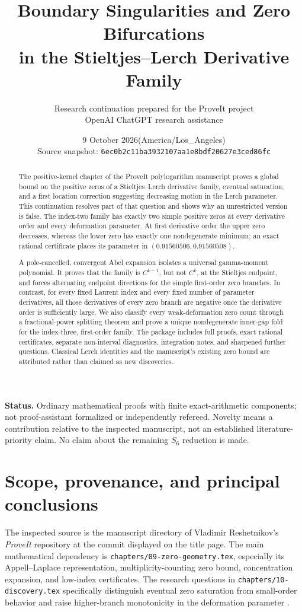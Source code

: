 \documentclass[11pt,letterpaper]{article}
\title{Boundary Singularities and Zero Bifurcations\\in the Stieltjes--Lerch Derivative Family}
\author{Research continuation prepared for the ProveIt project\\
\small OpenAI ChatGPT research assistance}
\date{9 October 2026\quad (America/Los\_Angeles)\\[4pt]
\small Source snapshot: \texttt{6ec0b2c11ba3932107aa1e8bdf20627e3ced86fc}}
\numberwithin{equation}{section}
\theoremstyle{definition}\newtheorem{definition}[theorem]{Definition}
\theoremstyle{remark}\newtheorem{remark}[theorem]{Remark}
\newcommand{\src}[1]{\nolinkurl{#1}}
\begin{document}
\maketitle
\begin{abstract}
The positive-kernel chapter of the ProveIt polylogarithm manuscript proves a global bound on the positive zeros of a Stieltjes--Lerch derivative family, eventual saturation, and a first location correction suggesting decreasing motion in the Lerch parameter. This continuation resolves part of that question and shows why an unrestricted version is false. The index-two family has exactly two simple positive zeros at every derivative order and every deformation parameter. At first derivative order the upper zero decreases, whereas the lower zero has exactly one nondegenerate minimum; an exact rational certificate places its parameter in $(0.91560506,0.91560508)$.

A pole-cancelled, convergent Abel expansion isolates a universal gamma-moment polynomial. It proves that the family is $C^{k-1}$, but not $C^k$, at the Stieltjes endpoint, and forces alternating endpoint directions for the simple first-order zero branches. In contrast, for every fixed Laurent index and every fixed number of parameter derivatives, all those derivatives of every zero branch are negative once the derivative order is sufficiently large. We also classify every weak-deformation zero count through a fractional-power splitting theorem and prove a unique nondegenerate inner-gap fold for the index-three, first-order family. The package includes full proofs, exact rational certificates, separate non-interval diagnostics, integration notes, and sharpened further questions. Classical Lerch identities and the manuscript's existing zero bound are attributed rather than claimed as new discoveries.
\end{abstract}
\vspace{5pt}
\noindent\textbf{Status.} Ordinary mathematical proofs with finite exact-arithmetic components; not proof-assistant formalized or independently refereed. Novelty means a contribution relative to the inspected manuscript, not an established literature-priority claim. No claim about the remaining $S_6$ reduction is made.
\clearpage
\tableofcontents
\newpage

\section{Scope, provenance, and principal conclusions}
The inspected source is the manuscript directory of Vladimir Reshetnikov's \emph{ProveIt} repository at the commit displayed on the title page. The main mathematical dependency is \src{chapters/09-zero-geometry.tex}, especially its Appell--Laplace representation, multiplicity-counting zero bound, concentration expansion, and low-index certificates. The research questions in \src{chapters/10-discovery.tex} specifically distinguish eventual zero saturation from small-order behavior and raise higher-branch monotonicity in the deformation parameter \cite{repo}.
\end{document}
